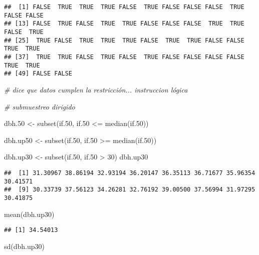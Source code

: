 \documentclass[
]{article}
\newenvironment{Shaded}{\begin{snugshade}}{\end{snugshade}}
\newcommand{\CommentTok}[1]{\textcolor[rgb]{0.56,0.35,0.01}{\textit{#1}}}
\newcommand{\DecValTok}[1]{\textcolor[rgb]{0.00,0.00,0.81}{#1}}
\newcommand{\FloatTok}[1]{\textcolor[rgb]{0.00,0.00,0.81}{#1}}
\newcommand{\FunctionTok}[1]{\textcolor[rgb]{0.00,0.00,0.00}{#1}}
\newcommand{\NormalTok}[1]{#1}
\newcommand{\OtherTok}[1]{\textcolor[rgb]{0.56,0.35,0.01}{#1}}
\newcommand{\SpecialCharTok}[1]{\textcolor[rgb]{0.00,0.00,0.00}{#1}}
\begin{document}
\begin{verbatim}
##  [1] FALSE  TRUE  TRUE  TRUE FALSE  TRUE FALSE FALSE FALSE  TRUE FALSE FALSE
## [13] FALSE  TRUE FALSE  TRUE  TRUE FALSE FALSE FALSE  TRUE  TRUE FALSE  TRUE
## [25]  TRUE FALSE  TRUE  TRUE  TRUE FALSE  TRUE  TRUE FALSE FALSE  TRUE  TRUE
## [37]  TRUE  TRUE FALSE  TRUE FALSE  TRUE FALSE FALSE FALSE FALSE  TRUE  TRUE
## [49] FALSE FALSE
\end{verbatim}

\begin{Shaded}
\begin{Highlighting}[]
\CommentTok{\# dice que datos cumplen la restricción... instruccion lógica}

\CommentTok{\# submuestreo dirigido}

\NormalTok{dbh}\FloatTok{.50} \OtherTok{\textless{}{-}} \FunctionTok{subset}\NormalTok{(if}\FloatTok{.50}\NormalTok{, if}\FloatTok{.50} \SpecialCharTok{\textless{}=} \FunctionTok{median}\NormalTok{(if}\FloatTok{.50}\NormalTok{))}

\NormalTok{dbh.up50 }\OtherTok{\textless{}{-}} \FunctionTok{subset}\NormalTok{(if}\FloatTok{.50}\NormalTok{, if}\FloatTok{.50} \SpecialCharTok{\textgreater{}=} \FunctionTok{median}\NormalTok{(if}\FloatTok{.50}\NormalTok{))}

\NormalTok{dbh.up30 }\OtherTok{\textless{}{-}} \FunctionTok{subset}\NormalTok{(if}\FloatTok{.50}\NormalTok{, if}\FloatTok{.50} \SpecialCharTok{\textgreater{}} \DecValTok{30}\NormalTok{)}
\NormalTok{dbh.up30}
\end{Highlighting}
\end{Shaded}

\begin{verbatim}
##  [1] 31.30967 38.86194 32.93194 36.20147 36.35113 36.71677 35.96354 30.41571
##  [9] 30.33739 37.56123 34.26281 32.76192 39.00500 37.56994 31.97295 30.41875
\end{verbatim}

\begin{Shaded}
\begin{Highlighting}[]
\FunctionTok{mean}\NormalTok{(dbh.up30)}
\end{Highlighting}
\end{Shaded}

\begin{verbatim}
## [1] 34.54013
\end{verbatim}

\begin{Shaded}
\begin{Highlighting}[]
\FunctionTok{sd}\NormalTok{(dbh.up30)}
\end{Highlighting}
\end{Shaded}
\end{document}
